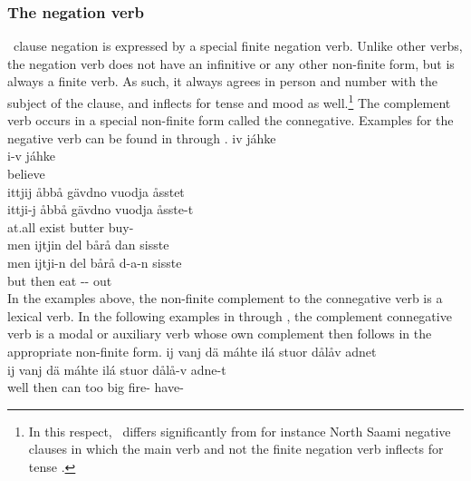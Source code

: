 \subsubsection{The negation verb}\label{negation}
\PS\ clause negation is expressed by a special finite negation verb. Unlike other verbs, the negation verb does not have an infinitive or any other non-finite form, but is always a finite verb. As such, it always agrees in person and number with the subject of the clause, and inflects for tense and mood as well.\footnote{In this respect, \PS\ differs significantly from for instance North Saami negative clauses in which the main verb and not the finite negation verb inflects for tense \citep[cf.][92]{Svonni2009}.} 
The complement verb occurs in a special non-finite form called the connegative.
Examples for the negative verb can be found in  through . 
\ea\label{negation1}%
\glll	iv jáhke\\
	i-v jáhke\\
	 believe\BS{} \\\nopagebreak
{} 
\z
\ea\label{negation2}%
\glll	ittjij åbbå gävdno vuodja åsstet\\
	ittji-j åbbå gävdno vuodja åsste-t\\
	 at.all exist\BS{} butter\BS{} buy-\\\nopagebreak
{} 
\z
\ea\label{negation3}%
\glll	men ijtjin del bårå dan sisste \\
	men ijtji-n del bårå d-a-n sisste \\
	but  then eat\BS{} -- out\\\nopagebreak
{} 
\z
In the examples above, the non-finite complement to the connegative verb is a lexical verb. In the following examples in  through , the complement connegative verb is a modal or auxiliary verb whose own complement then follows in the appropriate non-finite form.
\ea\label{negation4}%
\glll	ij vanj dä máhte ilá stuor dålåv adnet\\
	ij vanj dä máhte ilá stuor dålå-v adne-t\\
	\BS{} well then can\BS{} too big fire- have-\\\nopagebreak
